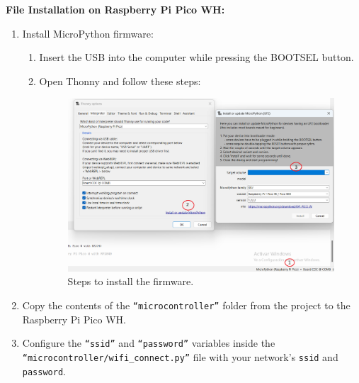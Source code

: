 \documentclass{article}
\begin{document}
\textbf{File Installation on Raspberry Pi Pico WH:}
\begin{enumerate}
	\item Install MicroPython firmware:
		\begin{enumerate}
			\item Insert the USB into the computer while pressing the BOOTSEL button.
			\item Open Thonny and follow these steps:
			\begin{figure}[H]
			\centering
			\includegraphics[width=0.8\linewidth]{../images/instalacion_firmware.png}
			\caption{\label{fig:instalación firmware}Steps to install the firmware.}
			\end{figure}
		\end{enumerate}
			\item Copy the contents of the \texttt{``microcontroller''} folder from the project to the Raspberry Pi Pico WH.
			\item Configure the \texttt{``ssid''} and \texttt{``password''} variables inside the \texttt{``microcontroller/wifi\_connect.py''} file with your network's \texttt{ssid} and \texttt{password}.
\end{enumerate}
\end{document}
